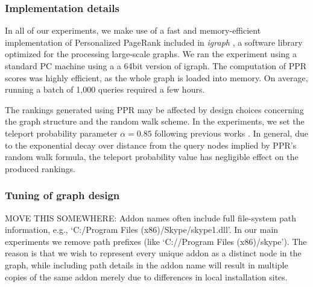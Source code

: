 \documentclass[ijoc,nonblindrev]{informs3} %
\numberwithin{equation}{subsection}
\begin{document}
\subsubsection{Implementation details}

In all of our experiments, we make use of a fast and memory-efficient implementation of Personalized PageRank included in {\it igraph} \citep{igraph}, a software library optimized for the processing large-scale graphs. We ran the experiment using a standard PC machine using a a 64bit version of igraph. The computation of PPR scores was highly efficient, as the whole graph is loaded into memory. On average, running a batch of 1,000 queries required a few hours. 

The rankings generated using PPR may be affected by design choices concerning the graph structure and the random walk scheme. In the experiments, we set the teleport probability parameter $\alpha=0.85$ following previous works \citep{boldi2005totalrank}. In general, due to the exponential decay over distance from the query nodes implied by PPR's random walk formula, the teleport probability value has negligible effect on the produced rankings. 

\subsubsection{Tuning of graph design}

MOVE THIS SOMEWHERE: Addon names often include full file-system path information, e.g.,
`C:/Program Files (x86)/Skype/skype1.dll'. In our main experiments we remove path prefixes 
(like `C://Program Files (x86)/skype'). The reason is that we wish to represent every unique addon as a distinct node in the graph, while including path details in the addon name will result in multiple copies of the same addon merely due to differences in local installation sites. 
\end{document}
